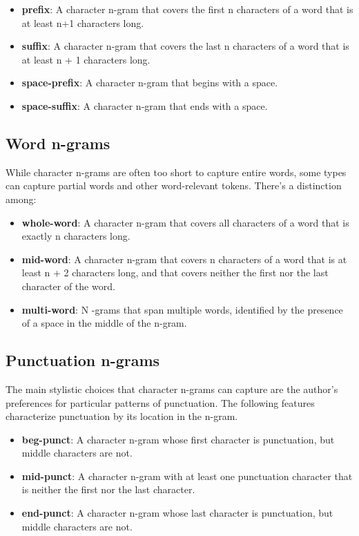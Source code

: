 \begin{itemize}
	\item \textbf{prefix}: A character n-gram that covers the first n characters of a word that is at least n+1 characters long.
	\item \textbf{suffix}: A character n-gram that covers the last n characters of a word that is at least n + 1 characters long.
	\item \textbf{space-prefix}: A character n-gram that begins with a space.
	\item \textbf{space-suffix}: A character n-gram that ends with a space.
\end{itemize}

\subsection{Word n-grams}
While character n-grams are often too short to capture entire words, some types can capture partial
words and other word-relevant tokens. There's a distinction among:

\begin{itemize}
	\item \textbf{whole-word}: A character n-gram that covers all characters of a word that is exactly n characters long.
	\item \textbf{mid-word}: A character n-gram that covers n characters of a word that is at least n + 2 characters long, and that covers neither the first nor the last character of the word.
	\item \textbf{multi-word}: N -grams that span multiple words, identified by the presence of a space in the middle of the n-gram.
\end{itemize}

\subsection{Punctuation n-grams}

The main stylistic choices that character n-grams can capture are the author’s preferences for particular patterns of punctuation. The following features characterize punctuation by its location in the n-gram.

\begin{itemize}
	\item \textbf{beg-punct}: A character n-gram whose first character is punctuation, but middle characters are not.
	\item \textbf{mid-punct}: A character n-gram with at least one punctuation character that is neither the first nor the last character.
	\item \textbf{end-punct}: A character n-gram whose last character is punctuation, but middle characters are not.
\end{itemize}


